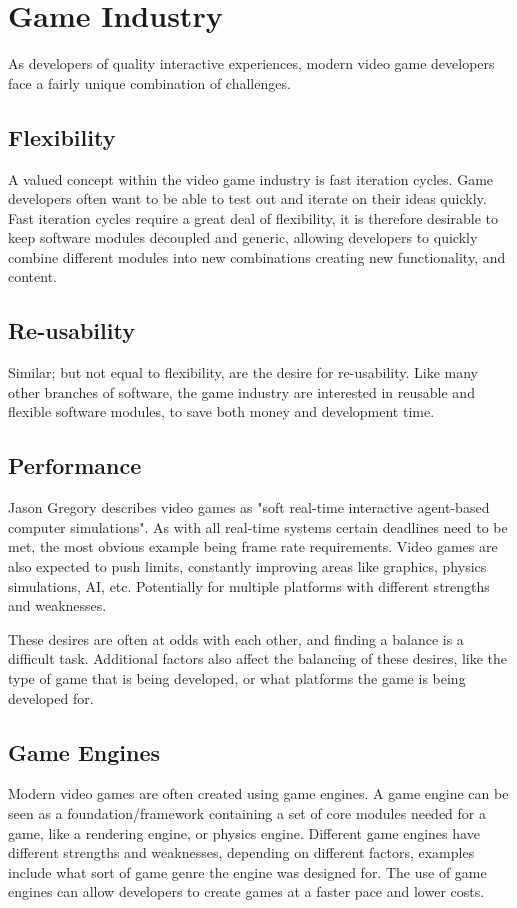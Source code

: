 \section{Game Industry}
As developers of quality interactive experiences, modern video game developers face a fairly unique
combination of challenges.

\subsection{Flexibility}
A valued concept within the video game industry is fast iteration cycles.
Game developers often want to be able to test out and iterate on their ideas quickly.
Fast iteration cycles require a great deal of flexibility,
it is therefore desirable to keep software modules decoupled and generic,
allowing developers to quickly combine different modules into new combinations creating new functionality,
and content.

\subsection{Re-usability}
Similar; but not equal to flexibility, are the desire for re-usability.
Like many other branches of software, the game industry are interested in reusable and flexible
software modules, to save both money and development time.

\subsection{Performance}
Jason Gregory\cite[p. 9]{game_engine_architecture} describes video games as "soft real-time interactive agent-based computer simulations".
As with all real-time systems certain deadlines need to be met, the most obvious example being frame rate requirements.
Video games are also expected to push limits, constantly improving areas like graphics, physics simulations, AI, etc.
Potentially for multiple platforms with different strengths and weaknesses.

These desires are often at odds with each other, and finding a balance is a difficult task.
Additional factors also affect the balancing of these desires, like the type of game that is being developed,
or what platforms the game is being developed for.

\subsection{Game Engines}
Modern video games are often created using game engines. A game engine can be seen as a foundation/framework
containing a set of core modules needed for a game, like a rendering engine, or physics engine.
Different game engines have different strengths and weaknesses, depending on different factors,
examples include what sort of game genre the engine was designed for.
The use of game engines can allow developers to create games at a faster pace and lower costs.
